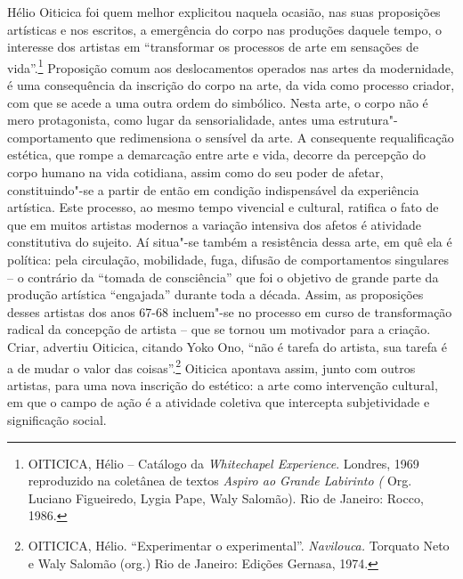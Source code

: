 Hélio Oiticica foi quem melhor explicitou naquela ocasião, nas suas
proposições artísticas e nos escritos, a emergência do corpo nas
produções daquele tempo, o interesse dos artistas em ``transformar os
processos de arte em sensações de vida''.\footnote{\textsc{OITICICA}, Hélio --
  Catálogo da \emph{Whitechapel Experience}. Londres, 1969 reproduzido
  na coletânea de textos \emph{Aspiro ao Grande Labirinto (} Org.
  Luciano Figueiredo, Lygia Pape, Waly Salomão). Rio de Janeiro: Rocco,
  1986.} Proposição comum aos deslocamentos operados nas artes da
modernidade, é uma consequência da inscrição do corpo na arte, da vida
como processo criador, com que se acede a uma outra ordem do simbólico.
Nesta arte, o corpo não é mero protagonista, como lugar da
sensorialidade, antes uma estrutura"-comportamento que redimensiona o
sensível da arte. A consequente requalificação estética, que rompe a
demarcação entre arte e vida, decorre da percepção do corpo humano na
vida cotidiana, assim como do seu poder de afetar, constituindo"-se a
partir de então em condição indispensável da experiência artística. Este
processo, ao mesmo tempo vivencial e cultural, ratifica o fato de que em
muitos artistas modernos a variação intensiva dos afetos é atividade
constitutiva do sujeito. Aí situa"-se também a resistência dessa arte, em
quê ela é política: pela circulação, mobilidade, fuga, difusão de
comportamentos singulares -- o contrário da ``tomada de consciência'' que %
foi o objetivo de grande parte da produção artística ``engajada''
durante toda a década. Assim, as proposições desses artistas dos anos
67-68 incluem"-se no processo em curso de transformação radical da
concepção de artista -- que se tornou um motivador para a criação.
Criar, advertiu Oiticica, citando Yoko Ono, ``não é tarefa do artista,
sua tarefa é a de mudar o valor das coisas''.\footnote{\textsc{OITICICA}, Hélio.
  ``Experimentar o experimental''. \emph{Navilouca.} Torquato Neto e
  Waly Salomão (org.) Rio de Janeiro: Edições Gernasa, 1974.} Oiticica
apontava assim, junto com outros artistas, para uma nova inscrição do
estético: a arte como intervenção cultural, em que o campo de ação é a
atividade coletiva que intercepta subjetividade e significação social.

